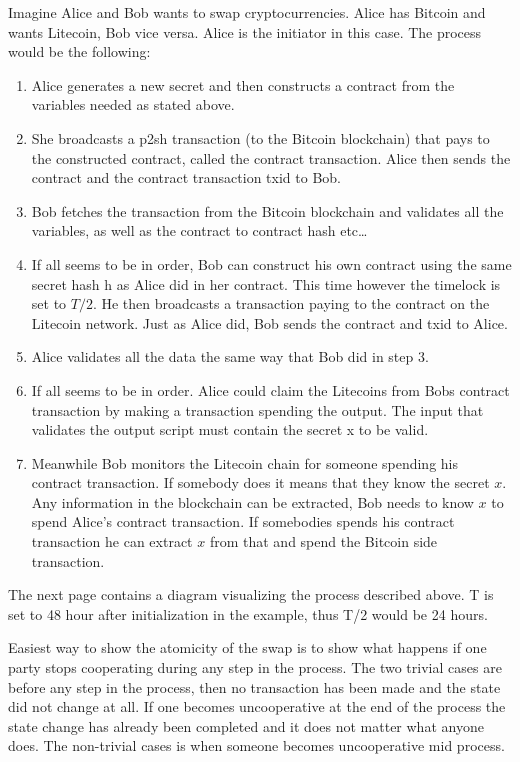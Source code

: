 Imagine Alice and Bob wants to swap cryptocurrencies. Alice has Bitcoin and wants Litecoin, Bob vice versa. Alice is the initiator in this case. The process would be the following:
\begin{enumerate}
	\item Alice generates a new secret and then constructs a contract from the variables needed as stated above.
	\item She broadcasts a p2sh transaction (to the Bitcoin blockchain) that pays to the constructed contract, called the contract transaction. Alice then sends the contract and the contract transaction txid to Bob.
	\item Bob fetches the transaction from the Bitcoin blockchain and validates all the variables, as well as the contract to contract hash etc\dots
	\item If all seems to be in order, Bob can construct his own contract using the same secret hash h as Alice did in her contract. This time however the timelock is set to $T/2$. He then broadcasts a transaction paying to the contract on the Litecoin network. Just as Alice did, Bob sends the contract and txid to Alice.
	\item Alice validates all the data the same way that Bob did in step 3. 
	\item If all seems to be in order. Alice could claim the Litecoins from Bobs contract transaction by making a transaction spending the output. The input that validates the output script must contain the secret x to be valid.
	\item Meanwhile Bob monitors the Litecoin chain for someone spending his contract transaction. If somebody does it means that they know the secret $x$. Any information in the blockchain can be extracted, Bob needs to know $x$ to spend Alice's contract transaction. If somebodies spends his contract transaction he can extract $x$ from that and spend the Bitcoin side transaction.
\end{enumerate}

The next page contains a diagram visualizing the process described above. T is set to 48 hour after initialization in the example, thus T/2 would be 24 hours.

Easiest way to show the atomicity of the swap is to show what happens if one party stops cooperating during any step in the process. The two trivial cases are before any step in the process, then no transaction has been made and the state did not change at all. If one becomes uncooperative at the end of the process the state change has already been completed and it does not matter what anyone does. The non-trivial cases is when someone becomes uncooperative mid process.\\

